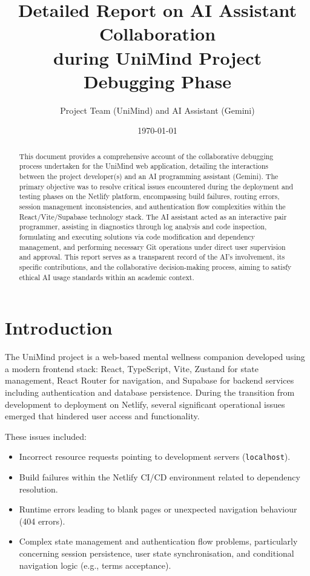\documentclass[11pt]{article} %
\title{Detailed Report on AI Assistant Collaboration\\ during UniMind Project Debugging Phase}
\author{Project Team (UniMind) and AI Assistant (Gemini)}
\date{\today}
\begin{document}
\maketitle
\tableofcontents
\newpage

\begin{abstract}
This document provides a comprehensive account of the collaborative debugging process undertaken for the UniMind web application, detailing the interactions between the project developer(s) and an AI programming assistant (Gemini). The primary objective was to resolve critical issues encountered during the deployment and testing phases on the Netlify platform, encompassing build failures, routing errors, session management inconsistencies, and authentication flow complexities within the React/Vite/Supabase technology stack. The AI assistant acted as an interactive pair programmer, assisting in diagnostics through log analysis and code inspection, formulating and executing solutions via code modification and dependency management, and performing necessary Git operations under direct user supervision and approval. This report serves as a transparent record of the AI's involvement, its specific contributions, and the collaborative decision-making process, aiming to satisfy ethical AI usage standards within an academic context.
\end{abstract}

\section{Introduction}
The UniMind project is a web-based mental wellness companion developed using a modern frontend stack: React, TypeScript, Vite, Zustand for state management, React Router for navigation, and Supabase for backend services including authentication and database persistence. During the transition from development to deployment on Netlify, several significant operational issues emerged that hindered user access and functionality.

These issues included:
\begin{itemize}
    \item Incorrect resource requests pointing to development servers (\texttt{localhost}).
    \item Build failures within the Netlify CI/CD environment related to dependency resolution.
    \item Runtime errors leading to blank pages or unexpected navigation behaviour (404 errors).
    \item Complex state management and authentication flow problems, particularly concerning session persistence, user state synchronisation, and conditional navigation logic (e.g., terms acceptance).
\end{itemize}
\end{document}
